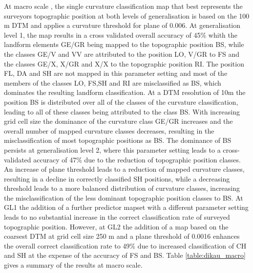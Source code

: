 \documentclass[preprint,12pt,authoryear]{elsarticle}
\begin{document}
 At macro scale , the single curvature classification map that best represents the surveyors topographic position at both levels of generalisation is based on the 100 m DTM and applies a curvature threshold for plane of 0.006. At generalisation level 1, the map results in a cross validated overall accuracy of 45\% whith the landform elements GE/GR being mapped to the topographic position BS, while the classes GE/V and VV are attributed to the position LO, V/GR to FS and the classes GE/X, X/GR and X/X to the topographic position RI. The position FL, DA and SH are not mapped in this parameter setting and most of the members of the classes LO, FS,SH and RI are misclassified as BS, which dominates the resulting landform classification. At a DTM resolution of 10m the position BS is distributed over all of the classes of the curvature classification, leading to all of these classes being attributed to the class BS. With increasing grid cell size the dominance of the curvature class GE/GR increases and the overall number of mapped curvature classes decreases, resulting in the misclassification of most topographic positions as BS.  The dominance of BS persists at generalisation level 2, where this parameter setting leads to a cross-validated accuracy of 47\% due to the reduction of topographic position classes. An increase of plane threshold leads to a reduction of mapped curvature classes, resulting in a decline in correctly classified SH positions, while a decreasing threshold leads to a more balanced distribution of curvature classes, increasing the misclassification of the less dominant topographic position classes to BS. At GL1 the addition of a further predictor mapset with a different parameter setting leads to no substantial increase in the correct classification rate of surveyed topographic position. However, at GL2 the addition of a map based on the coarsest DTM at grid cell size  250 m and a plane threshold of 0.0016 enhances the overall correct classification rate to 49\% due to increased classification of CH and SH at the expense of the accuracy of FS and BS. Table \ref{table:dikau_macro} gives a summary of the results at macro scale.
\end{document}
